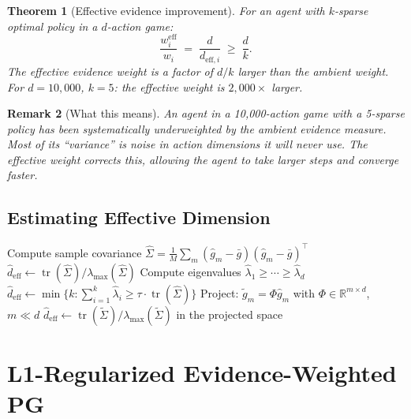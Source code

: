 \documentclass[11pt,a4paper]{article}
\newtheorem{theorem}{Theorem}[section]
\newtheorem{remark}[theorem]{Remark}
\DeclareMathOperator{\tr}{tr}
\newcommand{\R}{\mathbb{R}}
\begin{document}
\begin{theorem}[Effective evidence improvement]\label{thm:eff-evidence}
For an agent with $k$-sparse optimal policy in a $d$-action game:
\begin{equation}
  \frac{w_i^{\text{eff}}}{w_i} \;=\; \frac{d}{d_{\text{eff},i}} \;\geq\; \frac{d}{k}.
\end{equation}
The effective evidence weight is a factor of $d/k$ larger than the
ambient weight. For $d = 10{,}000$, $k = 5$: the effective weight
is $2{,}000\times$ larger.
\end{theorem}

\begin{remark}[What this means]
An agent in a 10,000-action game with a 5-sparse policy has been
\emph{systematically underweighted} by the ambient evidence measure.
Most of its ``variance'' is noise in action dimensions it will never use.
The effective weight corrects this, allowing the agent to take larger
steps and converge faster.
\end{remark}


\subsection{Estimating Effective Dimension}

\begin{algorithm}[H]
\caption{Effective Dimension Estimation}\label{alg:deff}
\KwIn{Gradient samples $\hat{g}_1, \ldots, \hat{g}_M \in \R^d$}
\BlankLine
Compute sample covariance $\hat{\Sigma} = \frac{1}{M}\sum_m (\hat{g}_m - \bar{g})(\hat{g}_m - \bar{g})^\top$\;
\BlankLine
{}
$\hat{d}_{\text{eff}} \leftarrow \tr(\hat{\Sigma}) / \lambda_{\max}(\hat{\Sigma})$\;
\BlankLine
{}
Compute eigenvalues $\hat{\lambda}_1 \geq \cdots \geq \hat{\lambda}_d$\;
$\hat{d}_{\text{eff}} \leftarrow \min\{k : \sum_{i=1}^k \hat{\lambda}_i \geq \tau \cdot \tr(\hat{\Sigma})\}$\;
\BlankLine
{}
Project: $\tilde{g}_m = \Phi \hat{g}_m$ with $\Phi \in \R^{m \times d}$, $m \ll d$\;
$\hat{d}_{\text{eff}} \leftarrow \tr(\tilde{\Sigma}) / \lambda_{\max}(\tilde{\Sigma})$ in the projected space\;
\end{algorithm}


\section{L1-Regularized Evidence-Weighted PG}
\end{document}
